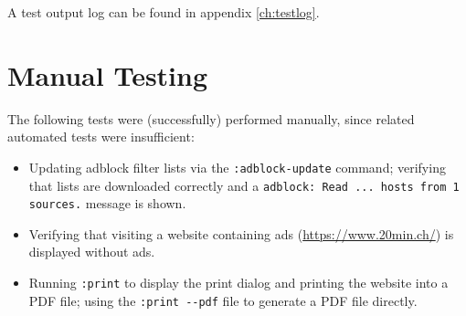 A test output log can be found in appendix \ref{ch:testlog}.

\section{Manual Testing}
The following tests were (successfully) performed manually, since related
automated tests were insufficient:

\begin{itemize}[parsep=5pt]
  \item Updating adblock filter lists via the \verb|:adblock-update| command;
    verifying that lists are downloaded correctly and a \texttt{adblock: Read ...
    hosts from 1 sources.} message is shown.
  \item Verifying that visiting a website containing ads
    (\url{https://www.20min.ch/}) is displayed without ads.
  \item Running \verb|:print| to display the print dialog and printing the
    website into a PDF file; using the \verb|:print --pdf| file to generate a
    PDF file directly.
\end{itemize}
